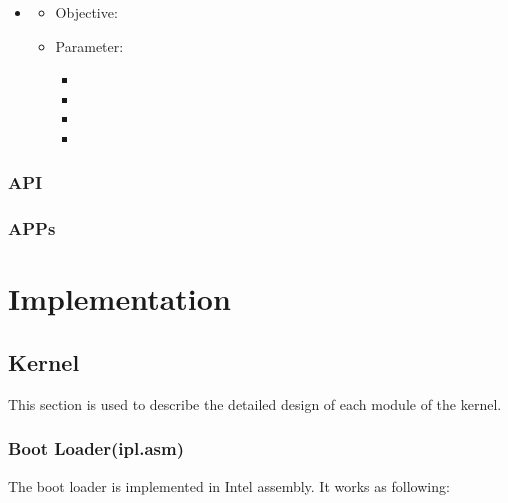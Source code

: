 \documentclass{swfcthesis}
\begin{document}
\begin{enumerate}
\begin{itemize}
\begin{itemize}
    \item \texttt{}
      \begin{itemize}
      \item Objective:
      \item Parameter:
        \begin{itemize}
        \item
        \item
        \item
        \item
        \end{itemize}
      \end{itemize}
      \end{itemize}
    
  \end{itemize}
  
  
\end{enumerate}

\subsection{API}
\label{sec:api}

\subsection{APPs}
\label{sec:apps-1}



\chapter{Implementation}

\section{Kernel}
This section is used to describe the detailed design of each module of the kernel.
\subsection{Boot Loader(ipl.asm)}

The boot loader is implemented in Intel assembly. It works as following:
\end{document}
